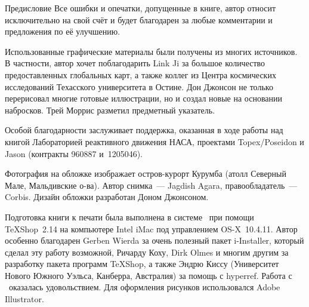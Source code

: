 \begin{chapter}{Предисловие}
Все ошибки и опечатки, допущенные в книге, автор относит исключительно
на свой счёт и будет благодарен за любые комментарии и предложения по
её улучшению.

Использованные графические материалы были получены из многих
источников.  В частности, автор хочет поблагодарить Link Ji за большое количество предоставленных глобальных карт, а также коллег из Центра космических исследований
Техасского университета в Остине. Дон Джонсон не только перерисовал
многие готовые иллюстрации, но и создал новые на основании
набросков. Трей Моррис разметил предметный указатель.

Особой благодарности заслуживает поддержка, оказанная в ходе работы над книгой
Лабораторией реактивного движения НАСА, проектами Topex/Poseidon и Jason
(контракты 960887 и~1205046).

Фотография на обложке изображает остров-курорт Курумба (атолл
Северный Мале, Мальдивские о-ва). Автор снимка~--- Jagdish Agara,
правообладатель~--- Corbis. Дизайн обложки разработан Доном Джонсоном.

Подготовка книги к печати была выполнена в системе \LaTeXe\ при помощи
TeXShop~2.14 на компьютере Intel iMac под управлением OS-X~10.4.11.
Автор особенно благодарен Gerben Wierda за очень полезный пакет i-Installer,
который сделал эту работу возможной, Ричарду Коху, Dirk Olmes
и многим другим за разработку пакета программ TeXShop,
а также Эндрю Киссу (Университет Нового Южного Уэльса, Канберра, Австралия)
за помощь с hyperref.
Работа с \LaTeXe\ оказалась удовольствием.
Для оформления рисунков использовался Adobe Illustrator.
\end{chapter}
